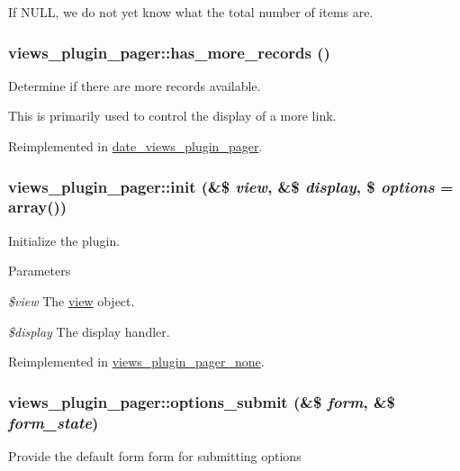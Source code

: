 If NULL, we do not yet know what the total number of items are. \hypertarget{classviews__plugin__pager_a8ab216a6bec20ad24a9645bb28f10cce}{
\subsubsection[{has\_\-more\_\-records}]{\setlength{\rightskip}{0pt plus 5cm}views\_\-plugin\_\-pager::has\_\-more\_\-records ()}}
\label{classviews__plugin__pager_a8ab216a6bec20ad24a9645bb28f10cce}
Determine if there are more records available.

This is primarily used to control the display of a more link. 

Reimplemented in \hyperlink{classdate__views__plugin__pager_ab26f5d4b54954461e72b60789d6efbb1}{date\_\-views\_\-plugin\_\-pager}.\hypertarget{classviews__plugin__pager_a3096789b9b8d3a912a6c5fb0ca8917a5}{
\subsubsection[{init}]{\setlength{\rightskip}{0pt plus 5cm}views\_\-plugin\_\-pager::init (\&\$ {\em view}, \/  \&\$ {\em display}, \/  \$ {\em options} = {\ttfamily array()})}}
\label{classviews__plugin__pager_a3096789b9b8d3a912a6c5fb0ca8917a5}
Initialize the plugin.


\begin{DoxyParams}{Parameters}
\item[{\em \$view}]The \hyperlink{classview}{view} object. \item[{\em \$display}]The display handler. \end{DoxyParams}


Reimplemented in \hyperlink{classviews__plugin__pager__none_a7d293fbd8b7b2a526c916ffd0bccc33a}{views\_\-plugin\_\-pager\_\-none}.\hypertarget{classviews__plugin__pager_a4e0e01490e6854df429e0136b236073b}{
\subsubsection[{options\_\-submit}]{\setlength{\rightskip}{0pt plus 5cm}views\_\-plugin\_\-pager::options\_\-submit (\&\$ {\em form}, \/  \&\$ {\em form\_\-state})}}
\label{classviews__plugin__pager_a4e0e01490e6854df429e0136b236073b}
Provide the default form form for submitting options 

